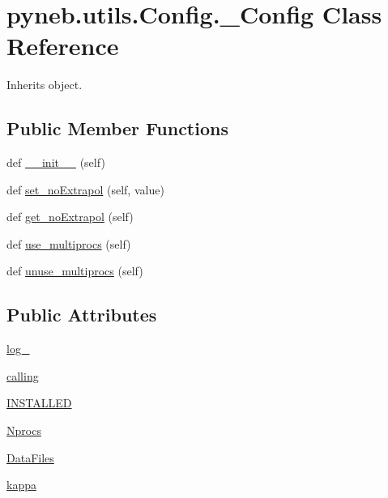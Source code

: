 \hypertarget{classpyneb_1_1utils_1_1_config_1_1___config}{}\section{pyneb.\+utils.\+Config.\+\_\+\+Config Class Reference}
\label{classpyneb_1_1utils_1_1_config_1_1___config}


Inherits object.

\subsection*{Public Member Functions}
\begin{DoxyCompactItemize}
\item 
def \hyperlink{classpyneb_1_1utils_1_1_config_1_1___config_aa11fc0ec5216188162c802fbe5815fc2}{\+\_\+\+\_\+init\+\_\+\+\_\+} (self)
\item 
def \hyperlink{classpyneb_1_1utils_1_1_config_1_1___config_a53f88ffa40d5212d3f88a585e3c3d595}{set\+\_\+no\+Extrapol} (self, value)
\item 
def \hyperlink{classpyneb_1_1utils_1_1_config_1_1___config_a2ab4cc94c90b0c726876cf355d795396}{get\+\_\+no\+Extrapol} (self)
\item 
def \hyperlink{classpyneb_1_1utils_1_1_config_1_1___config_a3254e6ea5ec1809863595645515288c8}{use\+\_\+multiprocs} (self)
\item 
def \hyperlink{classpyneb_1_1utils_1_1_config_1_1___config_aab9d7c77b65287b8823f3d448bef3580}{unuse\+\_\+multiprocs} (self)
\end{DoxyCompactItemize}
\subsection*{Public Attributes}
\begin{DoxyCompactItemize}
\item 
\hyperlink{classpyneb_1_1utils_1_1_config_1_1___config_a8304de6467642234fcf5a7ae1e7a16bd}{log\+\_\+}
\item 
\hyperlink{classpyneb_1_1utils_1_1_config_1_1___config_abf04542e5670abea107260ca7a6baf6d}{calling}
\item 
\hyperlink{classpyneb_1_1utils_1_1_config_1_1___config_ae07a752629612175b8000d374904b22a}{I\+N\+S\+T\+A\+L\+L\+E\+D}
\item 
\hyperlink{classpyneb_1_1utils_1_1_config_1_1___config_af47651c816db6a79ea1ba34e1594e2d4}{Nprocs}
\item 
\hyperlink{classpyneb_1_1utils_1_1_config_1_1___config_ab6b6d2b4a7046e65edca2cf9f92be911}{Data\+Files}
\item 
\hyperlink{classpyneb_1_1utils_1_1_config_1_1___config_a753691b738e636f400f909260d23c6eb}{kappa}
\end{DoxyCompactItemize}
